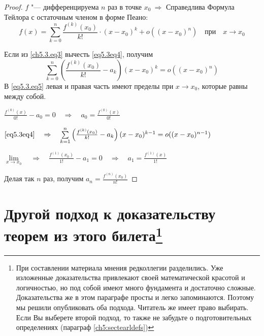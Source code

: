 \begin{proof}
$f$ "--- дифференцируема $n$ раз в точке $x_0 \ \Rightarrow$
Справедлива Формула Тейлора с остаточным членом в форме Пеано:
\begin{equation} \label{eq5.3eq4}
f(x) = \sum_{k = 0}^{n} \frac{f^{(k)}(x_0)}{k!} \cdot (x - x_0)^k + o((x - x_0)^n) \quad \text{при} \quad x \to x_0
\end{equation}

Если из \eqref{ch5.3.eq3} вычесть \eqref{eq5.3eq4}, получим
\begin{equation} \label{eq5.3.eq5}
\sum\limits_{k = 0}^{n} \left( \frac{f^{(k)}(x_0)}{k!} - a_k \right) (x - x_0)^k = o((x - x_0)^n)
\end{equation}
В \eqref{eq5.3.eq5} левая и правая часть имеют пределы при $x \to x_0$, которые равны между собой.

$\frac{f^{(0)}(x)}{0!} - a_0 = 0 \quad \Rightarrow \quad a_0 = \frac{f^{(0)}(x)}{0!}$

$\eqref{eq5.3eq4} \quad \Rightarrow \quad \sum\limits_{k = 1}^{n} \left( \frac{f^{(k)}(x_0)}{k!} - a_k \right) (x - x_0)^{k - 1} = o((x - x_0)^{n - 1})$

$\lim\limits_{x \to x_0} \quad \Rightarrow \quad \frac{f^{(1)}(x_0)}{1!} - a_1 = 0 \quad \Rightarrow \quad a_1 = \frac{f^{(1)}(x)}{1!}$

Делая так $n$ раз, получим $a_n = \frac{f^{(n)}(x_0)}{n!}$
\end{proof}


\section[Другой подход к доказательству теорем из этого билета]{Другой подход к доказательству теорем из этого билета\footnote{При составлении материала мнения редколлегии разделились. Уже изложенные доказательства привлекают своей математической красотой и логичностью, но под собой имеют много фундамента и достаточно сложные. Доказательства же в этом параграфе просты и легко запоминаются. Поэтому мы решили опубликовать оба подхода. Читатель же имеет право выбирать. Если Вы выберете второй подход, то также не забудьте о подготовительных определениях (параграф \ref{ch5:sectearldefs})}}

